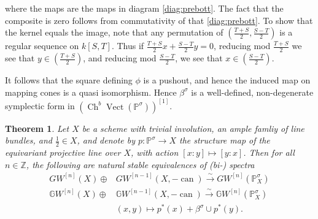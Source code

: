 \documentclass[edeposit,fullpage]{uiucthesis2009}
\newcommand{\mbb}{\mathbb}
\DeclareMathOperator{\can}{can}
\DeclareMathOperator{\Ch}{Ch}
\DeclareMathOperator{\Vect}{Vect}
\theoremstyle{plain}
\numberwithin{lemma}{section}
\newtheorem{theorem}[lemma]{Theorem}
\theoremstyle{definition}
\begin{document}
where the maps are the maps in diagram \ref{diag:prebott}. The fact
that the composite is zero follows from commutativity of that
\ref{diag:prebott}. To show that the kernel equals the image, note
that any permutation of $(\frac{T+S}{2},\frac{S-T}{2})$ is a regular sequence on
$k[S,T]$. Thus if  $\frac{T+S}{2}x + \frac{S-T}{2}y = 0$, reducing mod
$\frac{T+S}{2}$ we see that $y \in (\frac{T+S}{2})$, and reducing mod
$\frac{S-T}{2}$, we see that $x \in (\frac{S-T}{2})$. 


It follows that the square defining $\phi$ is a pushout, and hence the induced map on
mapping cones is a quasi isomorphism. Hence $\beta^\sigma$
is a well-defined, non-degenerate symplectic form in
$\left(\Ch^b\Vect(\mathbb P^\sigma)\right)^{[1]}$. 



\begin{theorem} \label{thm:proj_inv}
Let $X$ be a scheme with trivial involution, an ample famliy of line
bundles, and $\frac{1}{2} \in X$, and denote by $p : \mbb P^\sigma
\rightarrow X$ the structure map of the equivariant projective line
over $X$, with action $[x:y] \mapsto [y:x]$. Then for all $n \in \mbb
Z$, the following are natural stable equivalences of (bi-) spectra
\begin{align*}
GW^{[n]}(X) \oplus & GW^{[n-1]}(X,-\can) \xrightarrow{\sim}
GW^{[n]}(\mbb P^\sigma_X)\\
 \mbb GW^{[n]}(X) \oplus & \mbb GW^{[n-1]}(X,-\can) \xrightarrow{\sim}
\mbb GW^{[n]}(\mbb P^\sigma_X)\\
&(x,y) \mapsto p^*(x) + \beta^\sigma \cup p^*(y).
\end{align*}
\end{theorem}
\end{document}
